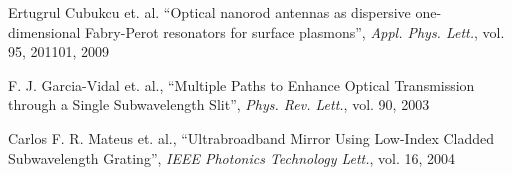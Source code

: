 \begin{thebibliography}{999}
  \bibitem
  {}
  Ertugrul Cubukcu et. al.
  ``Optical nanorod antennas as dispersive one-dimensional Fabry-Perot resonators for surface plasmons'',
  \textit{Appl. Phys. Lett.}, vol. 95, 201101,
  2009

  \bibitem
  {}
  F. J. Garcia-Vidal et. al.,
  ``Multiple Paths to Enhance Optical Transmission through a Single Subwavelength Slit'',
  \textit{Phys. Rev. Lett.}, vol. 90,
  2003

  \bibitem
  {}
  Carlos F. R. Mateus et. al.,
  ``Ultrabroadband Mirror Using Low-Index Cladded Subwavelength Grating'',
  \textit{IEEE Photonics Technology Lett.}, vol. 16,
  2004

\end{thebibliography}
